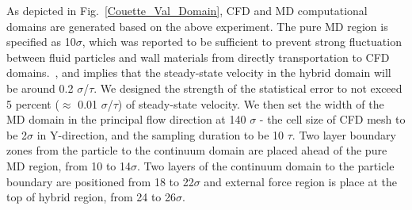 \documentclass[preprint,12pt]{elsarticle}
\begin{document}






As depicted in Fig.~\ref{Couette_Val_Domain}, CFD and MD computational domains are generated based on the above experiment. The pure MD region is specified as 10$\sigma$, which was reported to be sufficient to prevent strong fluctuation between fluid particles and wall materials from directly transportation to CFD domains.~\cite{Yen}, and implies that the steady-state velocity in the hybrid domain will be around 0.2 $\sigma$/$\tau$. We designed the strength of the statistical error to not exceed 5 percent ($\approx$ 0.01 $\sigma$/$\tau$) of steady-state velocity. We then set the width of the MD domain in the principal flow direction at 140 $\sigma$ - the cell size of CFD mesh to be 2$\sigma$ in Y-direction, and the sampling duration to be 10 $\tau$. Two layer boundary zones from the particle to the continuum domain are placed ahead of the pure MD region, from 10 to 14$\sigma$. Two layers of the continuum domain to the particle boundary are positioned from 18 to 22$\sigma$ and external force region is place at the top of hybrid region, from 24 to 26$\sigma$.
\end{document}
